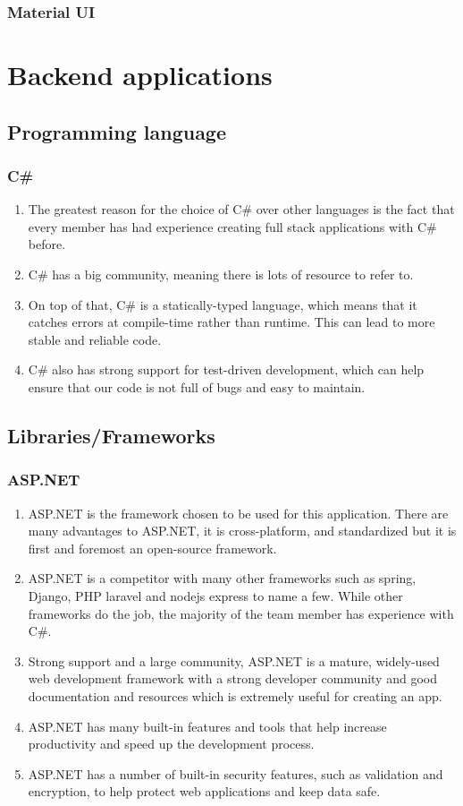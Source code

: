 \documentclass[singlespacing,12pt,parskip,headsepline,consistentlayout]{article}
\begin{document}
\subsubsection{Material UI}

\section{Backend applications}
\subsection{Programming language}
\subsubsection{C\#}
\begin{enumerate}
    \item The greatest reason for the choice of C\# over other languages is the fact that every member has had experience creating full stack applications with C\# before.
    \item C\# has a big community, meaning there is lots of resource to refer to.
    \item On top of that, C\# is a statically-typed language, which means that it catches errors at compile-time rather than runtime. This can lead to more stable and reliable code. \cite{csharpDcos}
    \item C\# also has strong support for test-driven development, which can help ensure that our code is not full of bugs and easy to maintain.
\end{enumerate}
\subsection{Libraries/Frameworks}
\subsubsection{ASP.NET}
\begin{enumerate}
    \item ASP.NET is the framework chosen to be used for this application. There are many advantages to ASP.NET, it is cross-platform, and standardized but it is first and foremost an open-source framework.
    \item ASP.NET is a competitor with many other frameworks such as spring, Django, PHP laravel and nodejs express to name a few. While other frameworks do the job, the majority of the team member has experience with C\#.
    \item Strong support and a large community, ASP.NET is a mature, widely-used web development framework with a strong developer community and good documentation and resources which is extremely useful for creating an app. \cite{aspnetDocs}
    \item ASP.NET has many built-in features and tools that help increase productivity and speed up the development process.
    \item ASP.NET has a number of built-in security features, such as validation and encryption, to help protect web applications and keep data safe.
\end{enumerate}
\end{document}
